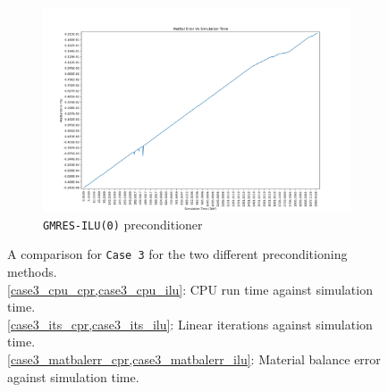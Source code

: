 \begin{figure}
\begin{subfigure}{.5\textwidth}
  \includegraphics[width=1.1\linewidth]{figures/case3/ilu/matbalerr_time.png_reduced.png}
  \caption{\texttt{GMRES-ILU(0)} preconditioner}
	\label{case3_matbalerr_ilu}
\end{subfigure}
\caption[caption]{A comparison for \texttt{Case 3} for the two different preconditioning methods.\\\hspace{\textwidth}
		\cref{case3_cpu_cpr,case3_cpu_ilu}: CPU run time against simulation time. \\\hspace{\textwidth}
		\cref{case3_its_cpr,case3_its_ilu}: Linear iterations against simulation time.\\\hspace{\textwidth}
		\cref{case3_matbalerr_cpr,case3_matbalerr_ilu}: Material balance error against simulation time.}
\label{case3sg}
\end{figure}
\clearpage

